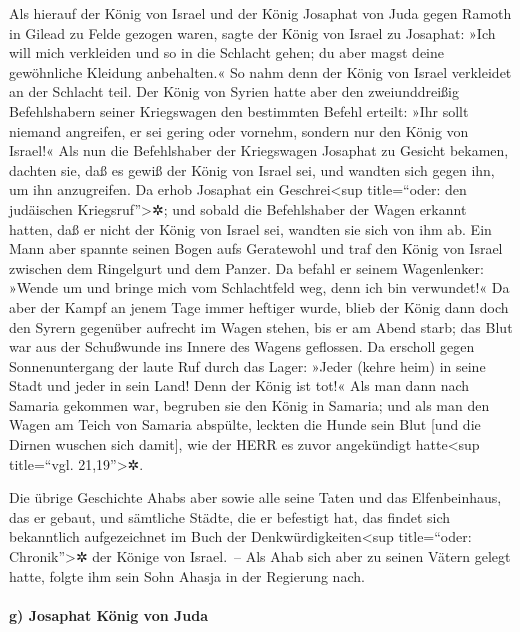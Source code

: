 Als hierauf der König von Israel und der König Josaphat
von Juda gegen Ramoth in Gilead zu Felde gezogen waren,
sagte der König von Israel zu Josaphat: »Ich will mich
verkleiden und so in die Schlacht gehen; du aber magst deine gewöhnliche
Kleidung anbehalten.« So nahm denn der König von Israel verkleidet an
der Schlacht teil. Der König von Syrien hatte aber den
zweiunddreißig Befehlshabern seiner Kriegswagen den bestimmten Befehl
erteilt: »Ihr sollt niemand angreifen, er sei gering oder vornehm,
sondern nur den König von Israel!« Als nun die
Befehlshaber der Kriegswagen Josaphat zu Gesicht bekamen, dachten sie,
daß es gewiß der König von Israel sei, und wandten sich gegen ihn, um
ihn anzugreifen. Da erhob Josaphat ein Geschrei\textless sup
title=``oder: den judäischen Kriegsruf''\textgreater✲;
und sobald die Befehlshaber der Wagen erkannt hatten, daß
er nicht der König von Israel sei, wandten sie sich von ihm ab.
Ein Mann aber spannte seinen Bogen aufs Geratewohl und
traf den König von Israel zwischen dem Ringelgurt und dem Panzer. Da
befahl er seinem Wagenlenker: »Wende um und bringe mich vom Schlachtfeld
weg, denn ich bin verwundet!« Da aber der Kampf an jenem
Tage immer heftiger wurde, blieb der König dann doch den Syrern
gegenüber aufrecht im Wagen stehen, bis er am Abend starb; das Blut war
aus der Schußwunde ins Innere des Wagens geflossen. Da
erscholl gegen Sonnenuntergang der laute Ruf durch das Lager: »Jeder
(kehre heim) in seine Stadt und jeder in sein Land! Denn der König ist
tot!« Als man dann nach Samaria gekommen war, begruben
sie den König in Samaria; und als man den Wagen am Teich
von Samaria abspülte, leckten die Hunde sein Blut {[}und die Dirnen
wuschen sich damit{]}, wie der HERR es zuvor angekündigt
hatte\textless sup title=``vgl. 21,19''\textgreater✲.

Die übrige Geschichte Ahabs aber sowie alle seine Taten
und das Elfenbeinhaus, das er gebaut, und sämtliche Städte, die er
befestigt hat, das findet sich bekanntlich aufgezeichnet im Buch der
Denkwürdigkeiten\textless sup title=``oder: Chronik''\textgreater✲ der
Könige von Israel.~-- Als Ahab sich aber zu seinen Vätern
gelegt hatte, folgte ihm sein Sohn Ahasja in der Regierung nach.

\hypertarget{g-josaphat-kuxf6nig-von-juda}{%
\paragraph{g) Josaphat König von
Juda}\label{g-josaphat-kuxf6nig-von-juda}}

